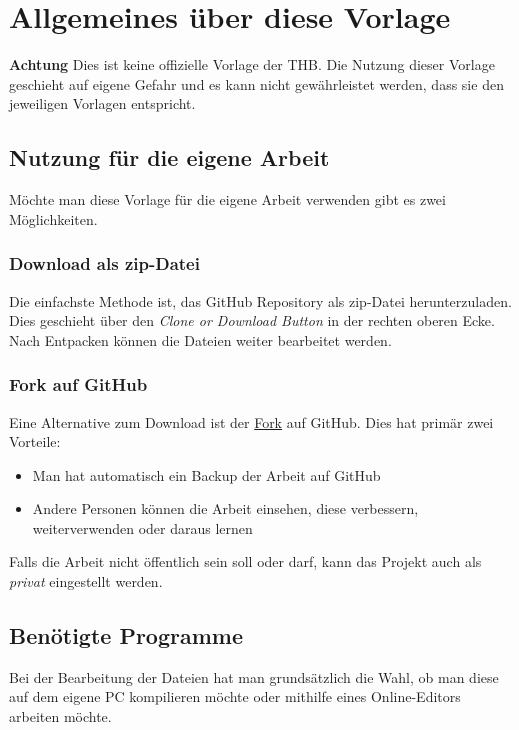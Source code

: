 \chapter{Allgemeines über diese Vorlage}
\begin{Large}
\textbf{Achtung}\quad
Dies ist keine offizielle Vorlage der THB. Die Nutzung dieser Vorlage geschieht auf eigene Gefahr und es kann nicht gewährleistet werden, dass sie den jeweiligen Vorlagen entspricht.
\end{Large}

\section{Nutzung für die eigene Arbeit}
Möchte man diese Vorlage für die eigene Arbeit verwenden gibt es zwei Möglichkeiten.

\subsection{Download als zip-Datei}
Die einfachste Methode ist, das GitHub Repository als zip-Datei herunterzuladen. Dies geschieht über den \textit{Clone or Download Button} in der rechten oberen Ecke. Nach Entpacken können die Dateien weiter bearbeitet werden.

\subsection{Fork auf GitHub}
Eine Alternative zum Download ist der \href{https://docs.github.com/en/get-started/quickstart/fork-a-repo}{Fork} auf GitHub. Dies hat primär zwei Vorteile:
\begin{itemize}
	\item Man hat automatisch ein Backup der Arbeit auf GitHub
	\item Andere Personen können die Arbeit einsehen, diese verbessern, weiterverwenden oder daraus lernen
\end{itemize}
Falls die Arbeit nicht öffentlich sein soll oder darf, kann das Projekt auch als \textit{privat} eingestellt werden.

\section{Benötigte Programme}
Bei der Bearbeitung der Dateien hat man grundsätzlich die Wahl, ob man diese auf dem eigene PC kompilieren möchte oder mithilfe eines Online-Editors arbeiten möchte.

